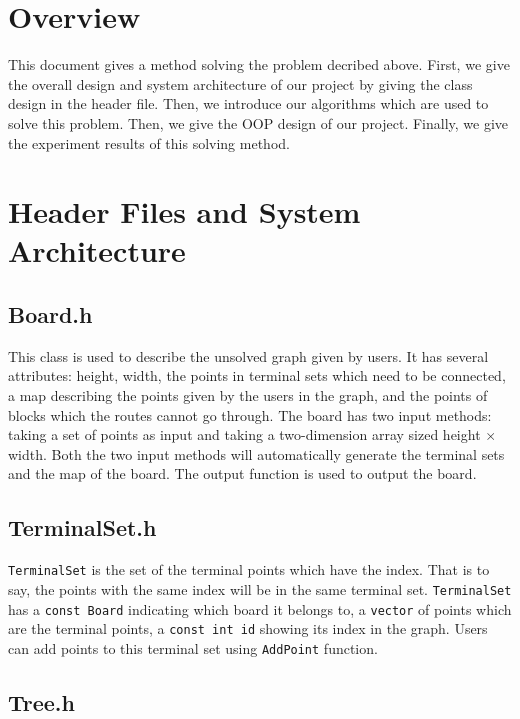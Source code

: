\documentclass[12pt, a4paper]{article}
\begin{document}
	\section{Overview}
	
		This document gives a method solving the problem decribed above. First, we give the overall design and system architecture of our project by giving the class design in the header file. Then, we introduce our algorithms which are used to solve this problem. Then, we give the OOP design of our project. Finally, we give the experiment results of this solving method.
	
	\section{Header Files and System Architecture}
	
		\subsection{Board.h}
		
			This class is used to describe the unsolved graph given by users. It has several attributes: height, width, the points in terminal sets which need to be connected, a map describing the points given by the users in the graph, and the points of blocks which the routes cannot go through. The board has two input methods: taking a set of points as input and taking a two-dimension array sized height $\times$ width. Both the two input methods will automatically generate the terminal sets and the map of the board. The output function is used to output the board.
		
		\subsection{TerminalSet.h}
		
			\texttt{TerminalSet} is the set of the terminal points which have the index. That is to say, the points with the same index will be in the same terminal set. \texttt{TerminalSet} has a \texttt{const Board} indicating which board it belongs to, a \texttt{vector} of points which are the terminal points, a \texttt{const int id} showing its index in the graph. Users can add points to this terminal set using \texttt{AddPoint} function.
				
		\subsection{Tree.h}
\end{document}
